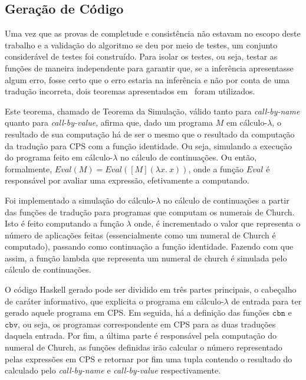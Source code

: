 \subsection{Geração de Código}\label{subsec:cps-code-gen}
Uma vez que as provas de completude e consistência não estavam no escopo deste trabalho e a validação do algoritmo se deu por meio de testes, um conjunto considerável de testes foi construído.
Para isolar os testes, ou seja, testar as funções de maneira independente para garantir que, se a inferência apresentasse algum erro, fosse certo que o erro estaria na inferência e não por conta de uma tradução incorreta, dois teoremas apresentados em~\cite{plotkin1975call} foram utilizados.

Este teorema, chamado de Teorema da Simulação, válido tanto para \textit{call-by-name} quanto para \textit{call-by-value}, afirma que, dado um programa $M$ em cálculo-$\lambda$, o resultado de sua computação há de ser o mesmo que o resultado da computação da tradução para CPS com a função identidade.
Ou seja, simulando a execução do programa feito em cálculo-$\lambda$ no cálculo de continuações.
Ou então, formalmente, $Eval(M) = Eval([M] (\lambda x.\ x))$, onde a função $Eval$ é responsável por avaliar uma expressão, efetivamente a computando.

Foi implementado a simulação do cálculo-$\lambda$ no cálculo de continuações a partir das funções de tradução para programas que computam os numerais de Church.
Isto é feito computando a função $\lambda$ onde, é incrementado o valor que representa o número de aplicações feitas (essencialmente como um numeral de Church é computado), passando como continuação a função identidade.
Fazendo com que assim, a função lambda que representa um numeral de church é simulada pelo cálculo de continuações.


O código Haskell gerado pode ser dividido em três partes principais, o cabeçalho de caráter informativo, que explicita o programa em cálculo-$\lambda$ de entrada para ter gerado aquele programa em CPS.
Em seguida, há a definição das funções $\mathtt{cbn}$ e $\mathtt{cbv}$, ou seja, os programas correspondente em CPS para as duas traduções daquela entrada.
Por fim, a última parte é responsável pela computação do numeral de Church, as funções definidas irão calcular o número representado pelas expressões em CPS e retornar por fim uma tupla contendo o resultado do calculado pelo \textit{call-by-name} e \textit{call-by-value} respectivamente.

